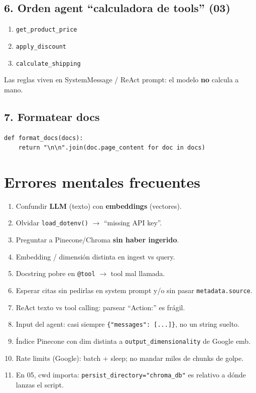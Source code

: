 \documentclass[11pt,a4paper]{article}
\begin{document}
\subsection{6. Orden agent ``calculadora de tools'' (03)}
\begin{enumerate}[leftmargin=*]
  \item \texttt{get\_product\_price}
  \item \texttt{apply\_discount}
  \item \texttt{calculate\_shipping}
\end{enumerate}
Las reglas viven en SystemMessage / ReAct prompt: el modelo \textbf{no} calcula a mano.

\subsection{7. Formatear docs}
\begin{lstlisting}
def format_docs(docs):
    return "\n\n".join(doc.page_content for doc in docs)
\end{lstlisting}

\section{Errores mentales frecuentes}

\begin{enumerate}[leftmargin=*,itemsep=2pt]
  \item Confundir \textbf{LLM} (texto) con \textbf{embeddings} (vectores).
  \item Olvidar \texttt{load\_dotenv()} $\to$ ``missing API key''.
  \item Preguntar a Pinecone/Chroma \textbf{sin haber ingerido}.
  \item Embedding / dimensión distinta en ingest vs query.
  \item Docstring pobre en \texttt{@tool} $\to$ tool mal llamada.
  \item Esperar citas sin pedirlas en system prompt y/o sin pasar \texttt{metadata.source}.
  \item ReAct texto vs tool calling: parsear ``Action:'' es frágil.
  \item Input del agent: casi siempre \lstinline|{"messages": [...]}|, no un string suelto.
  \item Índice Pinecone con dim distinta a \texttt{output\_dimensionality} de Google emb.
  \item Rate limits (Google): batch + sleep; no mandar miles de chunks de golpe.
  \item En 05, cwd importa: \texttt{persist\_directory="chroma\_db"} es relativo a dónde lanzas el script.
\end{enumerate}
\end{document}
